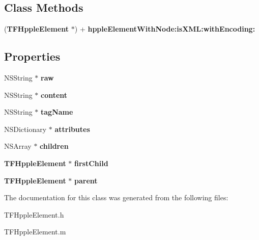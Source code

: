 \subsection*{Class Methods}
\begin{DoxyCompactItemize}
\item 
({\bf T\+F\+Hpple\+Element} $\ast$) + {\bfseries hpple\+Element\+With\+Node\+:is\+X\+M\+L\+:with\+Encoding\+:}\label{interface_t_f_hpple_element_a617d6eb7c9674ebfced840c1764028a5}

\end{DoxyCompactItemize}
\subsection*{Properties}
\begin{DoxyCompactItemize}
\item 
N\+S\+String $\ast$ {\bfseries raw}\label{interface_t_f_hpple_element_a67a2f29f7e31c69d23e2365f7602241a}

\item 
N\+S\+String $\ast$ {\bfseries content}\label{interface_t_f_hpple_element_a92efb1ac82fa89fe4221a7f2363332ea}

\item 
N\+S\+String $\ast$ {\bfseries tag\+Name}\label{interface_t_f_hpple_element_a25cfdaa376701dc9817c1b2c7e135b75}

\item 
N\+S\+Dictionary $\ast$ {\bfseries attributes}\label{interface_t_f_hpple_element_aea9972700f45beb7197f03b20cfbd3d2}

\item 
N\+S\+Array $\ast$ {\bfseries children}\label{interface_t_f_hpple_element_a6023a02b0f33943aad395504981b24ba}

\item 
{\bf T\+F\+Hpple\+Element} $\ast$ {\bfseries first\+Child}\label{interface_t_f_hpple_element_afb83964b315f36faa2ad67dc71645ada}

\item 
{\bf T\+F\+Hpple\+Element} $\ast$ {\bfseries parent}\label{interface_t_f_hpple_element_a8fc33c0ff70941d9638f05632ad6ba5d}

\end{DoxyCompactItemize}


The documentation for this class was generated from the following files\+:\begin{DoxyCompactItemize}
\item 
T\+F\+Hpple\+Element.\+h\item 
T\+F\+Hpple\+Element.\+m\end{DoxyCompactItemize}
